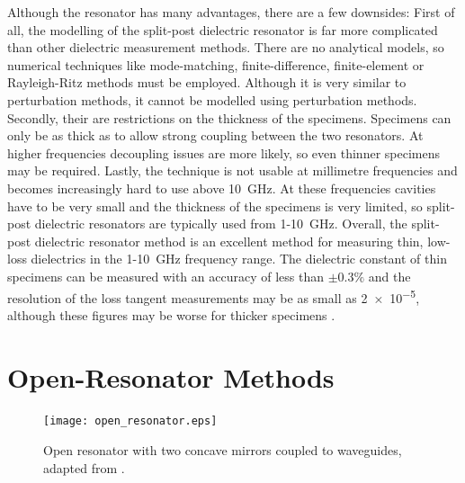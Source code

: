 Although the resonator has many advantages, there are a few downsides: First of all, the modelling of the split-post dielectric resonator is far more complicated than other dielectric measurement methods. There are no analytical models, so numerical techniques like mode-matching, finite-difference, finite-element or Rayleigh-Ritz methods must be employed. Although it is very similar to perturbation methods, it cannot be modelled using perturbation methods. Secondly, their are restrictions on the thickness of the specimens. Specimens can only be as thick as to allow strong coupling between the two resonators. At higher frequencies decoupling issues are more likely, so even thinner specimens may be required. Lastly, the technique is not usable at millimetre frequencies and becomes increasingly hard to use above \SI{10}{\giga\hertz}. At these frequencies cavities have to be very small and the thickness of the specimens is very limited, so split-post dielectric resonators are typically used from 1-\SI{10}{\giga\hertz}. Overall, the split-post dielectric resonator method is an excellent method for measuring thin, low-loss dielectrics in the 1-\SI{10}{\giga\hertz} frequency range. The dielectric constant of thin specimens can be measured with an accuracy of less than $\pm 0.3\%$ and the resolution of the loss tangent measurements may be as small as \num{2e-5}, although these figures may be worse for thicker specimens \cite{NPL, janezicSPDR, krupka}.
\section{Open-Resonator Methods}
\begin{figure}
\centering
\texttt{[image: open\_resonator.eps]}
\caption{Open resonator with two concave mirrors coupled to waveguides, adapted from \cite{NPL}.}\label{fig:or}
\end{figure}

